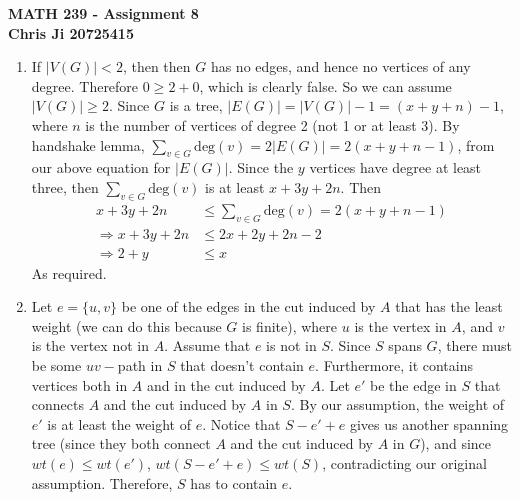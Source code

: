 \documentclass[10pt,english]{article}
\begin{document}
\noindent \begin{center}
\textbf{\large{}MATH 239 - Assignment 8}\\
\textbf{\large{}Chris Ji 20725415}
\par\end{center}{\large \par}
\medskip{}

\begin{enumerate}
\item If $|V(G)|<2$, then then $G$ has no edges, and hence no vertices of any degree. Therefore $0\geq 2+0$, which is clearly false. So we can assume $|V(G)|\geq2$. Since $G$ is a tree, $|E(G)|=|V(G)|-1=(x+y+n)-1$, where $n$ is the number of vertices of degree 2 (not 1 or at least 3). By handshake lemma, $\sum_{v\in G}\text{deg}(v)=2|E(G)|=2(x+y+n-1)$, from our above equation for $|E(G)|$. Since the $y$ vertices have degree at least three, then $\sum_{v\in G}\text{deg}(v)$ is at least $x+3y+2n$. Then \begin{align*}x+3y+2n&\leq\sum_{v\in G}\text{deg}(v)=2(x+y+n-1)\\\Rightarrow x+3y+2n&\leq 2x+2y+2n-2\\\Rightarrow 2+y&\leq x\end{align*} As required. 


\item Let $e=\{u,v\}$ be one of the edges in the cut induced by $A$ that has the least weight (we can do this because $G$ is finite), where $u$ is the vertex in $A$, and $v$ is the vertex not in $A$. Assume that $e$ is not in $S$. Since $S$ spans $G$, there must be some $uv-$path in $S$ that doesn't contain $e$. Furthermore, it contains vertices both in $A$ and in the cut induced by $A$. Let $e'$ be the edge in $S$ that connects $A$ and the cut induced by $A$ in $S$. By our assumption, the weight of $e'$ is at least the weight of $e$. Notice that $S-e'+e$ gives us another spanning tree (since they both connect $A$ and the cut induced by $A$ in $G$), and since $wt(e)\leq wt(e')$, $wt(S-e'+e)\leq wt(S)$, contradicting our original assumption. Therefore, $S$ has to contain $e$. 



\end{enumerate}
\end{document}
